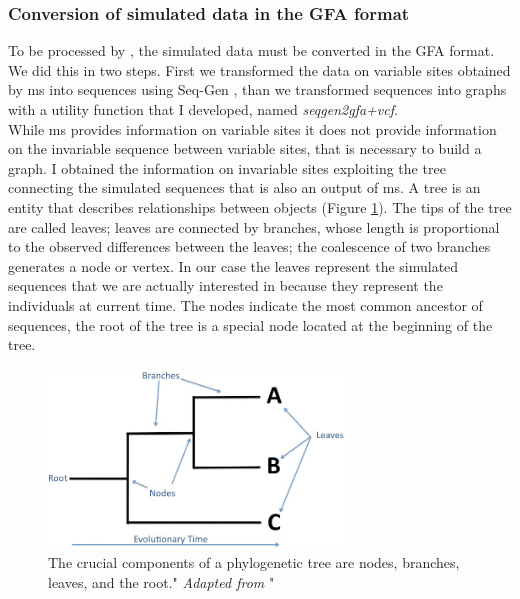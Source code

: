 
\subsubsection{Conversion of simulated data in the GFA format}  

To be processed by \vgp, the simulated data must be converted in the GFA format. We did this in two steps. First we transformed the data on variable sites obtained by ms into sequences using Seq-Gen \cite{rambaut1997seq}, than we transformed sequences into graphs with a utility function that I developed, named \textit{seqgen2gfa+vcf}. \\





While ms provides information on variable sites it does not provide information on the invariable sequence between variable sites, that is necessary to build a graph. I obtained the information on invariable sites exploiting the tree connecting the simulated sequences that is also an output of ms. A tree is an entity that describes relationships between objects (Figure \ref{fig:phylogenies.jpg}). The tips of the tree are called leaves; leaves are connected by branches, whose length is proportional to the observed differences between the leaves; the coalescence of two branches generates a node or vertex. In our case the leaves represent the simulated sequences that we are actually interested in because they represent the individuals at current time. The nodes indicate the most common ancestor of sequences, the root of the tree is a special node located at the beginning of the tree. \\


\begin{figure}[H]
\centering
\includegraphics[width=0.70\textwidth]{fig/phylogenies.jpg}
\decoRule
\caption{The crucial components of a phylogenetic tree are nodes, branches, leaves, and the root." \textit{Adapted from} \cite{phylogenetictree}"} 
\label{fig:phylogenies.jpg}
\end{figure}

